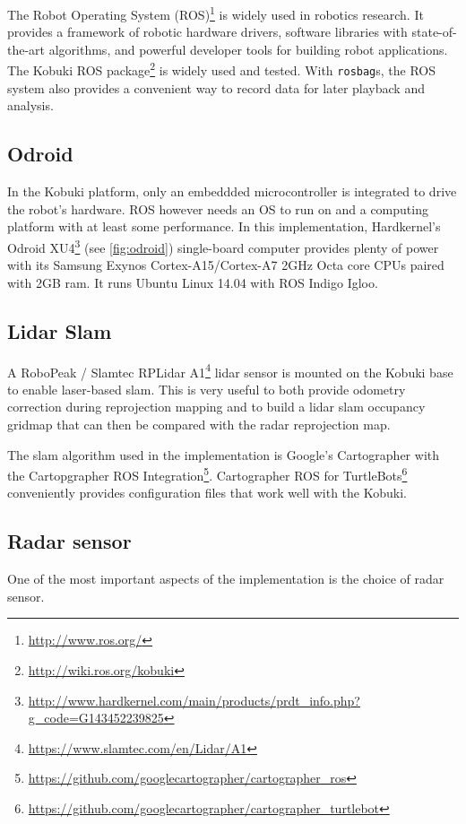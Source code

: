 The Robot Operating System (ROS)\footnote{\url{http://www.ros.org/}} is widely used in robotics research. It provides a framework of robotic hardware drivers, software libraries with state-of-the-art algorithms, and powerful developer tools for building robot applications. The Kobuki ROS package\footnote{\url{http://wiki.ros.org/kobuki}} is widely used and tested. With \texttt{rosbag}s, the ROS system also provides a convenient way to record data for later playback and analysis.

\subsection{Odroid}\label{odroid}

In the Kobuki platform, only an embeddded microcontroller is integrated to drive the robot's hardware. ROS however needs an OS to run on and a computing platform with at least some performance. In this implementation, Hardkernel's Odroid XU4\footnote{\url{http://www.hardkernel.com/main/products/prdt_info.php?g_code=G143452239825}} (see \cref{fig:odroid}) single-board computer provides plenty of power with its Samsung Exynos Cortex-A15/Cortex-A7 2GHz Octa core CPUs paired with 2GB ram. It runs Ubuntu Linux 14.04 with ROS Indigo Igloo.

\subsection{Lidar Slam}\label{lidar}
A RoboPeak / Slamtec RPLidar A1\footnote{\url{https://www.slamtec.com/en/Lidar/A1}} lidar sensor is mounted on the Kobuki base to enable laser-based slam. This is very useful to both provide odometry correction during reprojection mapping and to build a lidar slam occupancy gridmap that can then be compared with the radar reprojection map.

The slam algorithm used in the implementation is Google's Cartographer \cite{Hess2016} with the Cartopgrapher ROS Integration\footnote{\url{https://github.com/googlecartographer/cartographer_ros}}. Cartographer ROS for TurtleBots\footnote{\url{https://github.com/googlecartographer/cartographer_turtlebot}} conveniently provides configuration files that work well with the Kobuki.

\subsection{Radar sensor}\label{radar-sensor}

One of the most important aspects of the implementation is the choice of radar sensor.

